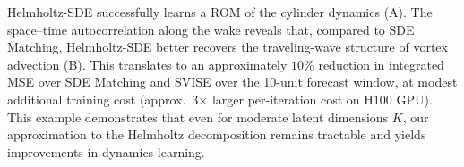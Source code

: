 Helmholtz-SDE successfully learns a ROM of the cylinder dynamics (A).
The space--time autocorrelation along the wake reveals that, compared to SDE Matching, Helmholtz-SDE better recovers the traveling-wave structure of vortex advection (B). 
This translates to an approximately $10\%$ reduction in integrated MSE over SDE Matching and SVISE over the 10-unit forecast window, at modest additional training cost (approx.~3$\times$ larger per-iteration cost on H100 GPU). 
This example demonstrates that even for moderate latent dimensions $K$, our approximation to the Helmholtz decomposition remains tractable and yields improvements in dynamics learning.